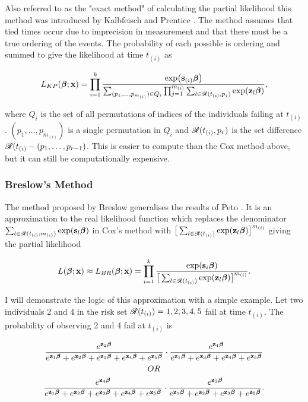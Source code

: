 Also referred to as the "exact method" of calculating the partial likelihood this method was introduced by Kalbfeisch and Prentice . The method assumes that tied times occur due to imprecision in measurement and that there must be a true ordering of the events. The probability of each possible is ordering and summed to give the likelihood at time $t_{(i)}$ as

\begin{equation}
    L_{KP}(\boldsymbol{\beta};\textbf{x})=\prod_{i=1}^k\frac{\exp(\textbf{s}_{(i)}\boldsymbol{\beta})}{\sum_{(p_1,\ldots,p_{m_{(i)}})\in Q_i}\prod_{j=1}^{m_{(i)}}\sum_{l\in\mathscr{R}(t_{(i)},p_j)}\exp(\textbf{z}_l\boldsymbol{\beta})},
\end{equation}

where $Q_i$ is the set of all permutations of indices of the individuals failing at $t_{(i)}$. $(p_1,\ldots,p_{m_{(i)}})$ is a single permutation in $Q_i$ and $\mathscr{R}(t_{(i)},p_r)$ is the set difference $\mathscr{R}(t_{(i)}-(p_1,\ldots,p_{r-1})$. This is easier to compute than the Cox method above, but it can still be computationally expensive.

\subsubsection{Breslow's Method}

The method proposed by Breslow  generalises the results of Peto . It is an approximation to the real likelihood function which replaces the denominator $\sum_{l\in\mathscr{R}(t_{(i)};m_{(i)})}\exp(\textbf{s}_l\boldsymbol{\beta})$ in Cox's method with $\big[\sum_{l\in\mathscr{R}(t_{(i)})}\exp(\textbf{z}_l\boldsymbol{\beta})\big]^{m_{(i)}}$ giving the partial likelihood

\begin{equation}
    L(\boldsymbol{\beta};\textbf{x})\approx L_{BR}(\boldsymbol{\beta};\textbf{x})=\prod_{i=1}^k\frac{\exp(\textbf{s}_i\boldsymbol{\beta})}{\big[\sum_{l\in\mathscr{R}(t_{(i)})}\exp(\textbf{z}_l\boldsymbol{\beta})\big]^{m_{(i)}}}.
\end{equation}

I will demonstrate the logic of this approximation with a simple example. Let two individuals 2 and 4 in the risk set $\mathscr{R}(t_{(i)})={1,2,3,4,5}$ fail at time $t_{(i)}$. The probability of observing 2 and 4 fail at $t_{(i)}$ is

\begin{gather*}
    \frac{e^{\textbf{z}_2\boldsymbol{\beta}}}{e^{\textbf{z}_1\boldsymbol{\beta}}+e^{\textbf{z}_2\boldsymbol{\beta}}+e^{\textbf{z}_3\boldsymbol{\beta}}+e^{\textbf{z}_4\boldsymbol{\beta}}+e^{\textbf{z}_5\boldsymbol{\beta}}}\cdot\frac{e^{\textbf{z}_4\boldsymbol{\beta}}}{e^{\textbf{z}_1\boldsymbol{\beta}}+e^{\textbf{z}_3\boldsymbol{\beta}}+e^{\textbf{z}_4\boldsymbol{\beta}}+e^{\textbf{z}_5\boldsymbol{\beta}}}\\
    OR\\
    \frac{e^{\textbf{z}_4\boldsymbol{\beta}}}{e^{\textbf{z}_1\boldsymbol{\beta}}+e^{\textbf{z}_2\boldsymbol{\beta}}+e^{\textbf{z}_3\boldsymbol{\beta}}+e^{\textbf{z}_4\boldsymbol{\beta}}+e^{\textbf{z}_5\boldsymbol{\beta}}}\cdot\frac{e^{\textbf{z}_2\boldsymbol{\beta}}}{e^{\textbf{z}_1\boldsymbol{\beta}}+e^{\textbf{z}_2\boldsymbol{\beta}}+e^{\textbf{z}_3\boldsymbol{\beta}}+e^{\textbf{z}_5\boldsymbol{\beta}}}.
\end{gather*}


